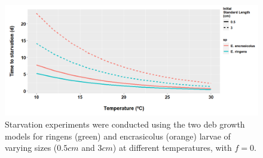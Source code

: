 \begin{figure}[H]
	\includegraphics[width=1.0\textwidth]{figures/Chap4Starvation_compar.png}
	\centering
	\caption{Starvation experiments were conducted using the two \acrshort{deb} growth models for \gls{ringens} (green) and \gls{encrasicolus} (orange) larvae of varying sizes ($0.5 cm$ and $3 cm$) at different temperatures, with $f = 0$.}
	\label{Chap4Starvation_compar}
\end{figure}
%

